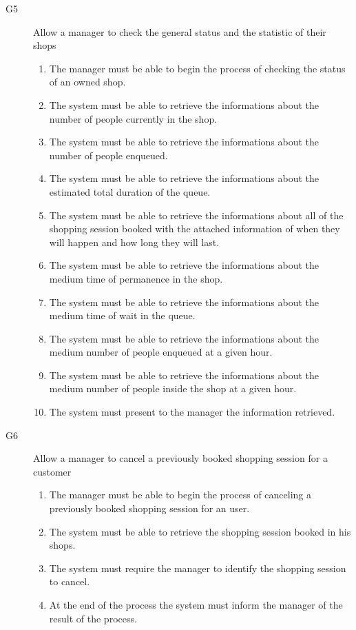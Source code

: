 \begin{description}
    \item [G5] Allow a manager to check the general status and the statistic of their shops
        \begin{enumerate}[resume*]
            \item The manager must be able to begin the process of checking the status of an owned shop.
            \item The system must be able to retrieve the informations about the number of people currently in the shop.
            \item The system must be able to retrieve the informations about the number of people enqueued.
            \item The system must be able to retrieve the informations about the estimated total duration of the queue.
            \item The system must be able to retrieve the informations about all of the shopping session booked with the attached information of when they will happen and how long they will last.
            \item The system must be able to retrieve the informations about the medium time of permanence in the shop. 
            \item The system must be able to retrieve the informations about the medium time of wait in the queue.
            \item The system must be able to retrieve the informations about the medium number of people enqueued at a given hour.
            \item The system must be able to retrieve the informations about the medium number of people inside the shop at a given hour.
            \item The system must present to the manager the information retrieved.
        \end{enumerate}
    \item [G6] Allow a manager to cancel a previously booked shopping session for a customer 
        \begin{enumerate}[resume*]
            \item The manager must be able to begin the process of canceling a previously booked shopping session for an user.
            \item The system must be able to retrieve the shopping session booked in his shops.
            \item The system must require the manager to identify the shopping session to cancel.
            \item At the end of the process the system must inform the manager of the result of the process.

\end{enumerate}
\end{description}
